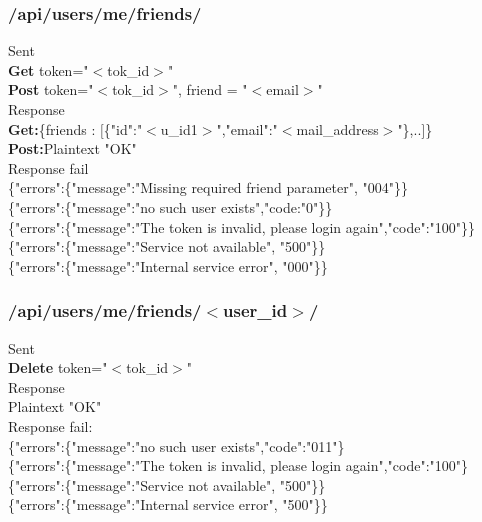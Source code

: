 
\subsubsection{/api/users/me/friends/}
\tab	Sent\\
\tab\tab	\textbf{Get} token="$<$tok\_id$>$"\\
\tab\tab	\textbf{Post} token="$<$tok\_id$>$", friend = "$<$email$>$"\\
\tab	Response\\
\tab\tab	\textbf{Get:}\tab	\{friends : $[$\{"id":"$<$u\_id1$>$","email":"$<$mail\_address$>$"\},..$]$\}\\
\tab\tab	\textbf{Post:}\tab	Plaintext "OK"\\
\tab	Response fail\\
\tab\tab	\{"errors":\{"message":"Missing required friend parameter", "004"\}\}\\
\tab\tab	\{"errors":\{"message":"no such user exists","code:"0"\}\}\\
\tab\tab	\{"errors":\{"message":"The token is invalid, please login again","code":"100"\}\}\\
\tab\tab	\{"errors":\{"message":"Service not available", "500"\}\}\\
\tab\tab	\{"errors":\{"message":"Internal service error", "000"\}\}\\

\subsubsection{/api/users/me/friends/$<$user\_id$>$/}
\tab	Sent\\
\tab\tab	\textbf{Delete} token="$<$tok\_id$>$"\\
\tab	Response\\
\tab\tab	Plaintext "OK"\\
\tab	Response fail:\\
\tab\tab	\{"errors":\{"message":"no such user exists","code":"011"\}\\
\tab\tab	\{"errors":\{"message":"The token is invalid, please login again","code":"100"\}\\
\tab\tab	\{"errors":\{"message":"Service not available", "500"\}\}\\
\tab\tab	\{"errors":\{"message":"Internal service error", "500"\}\}\\
